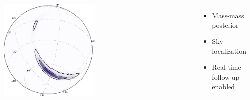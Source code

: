 \documentclass[aspectratio=169]{beamer}
\begin{document}
\begin{frame}
\begin{columns}
        \includegraphics[width=0.49\textwidth]{figures/ligo_lambert-skymap}
        \vspace{10pt}
        \begin{itemize}
            \item Mass-mass posterior
            \item Sky localization
            \item Real-time follow-up enabled
        \end{itemize}
    \end{columns}
\end{frame}
\end{document}

